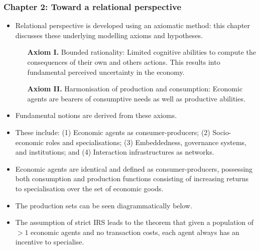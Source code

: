 \documentclass[10pt]{beamer}
\begin{document}
\begin{frame} \frametitle{Chapter 2: Toward a relational perspective}
\begin{itemize}
\item Relational perspective is developed using an axiomatic method: this chapter discusses these underlying modelling axioms and hypotheses.
\begin{itemize}
\medskip
\item[\textbf{Axiom I.}] Bounded rationality: Limited cognitive abilities to compute the consequences of their own and others actions. This
results into fundamental perceived uncertainty in the economy.
\medskip
\item[\textbf{Axiom II.}] Harmonisation of production and consumption: Economic agents are bearers of consumptive needs as well as productive abilities.
\end{itemize}
\medskip
\item Fundamental notions are derived from these axioms.
\medskip
\item These include: (1) Economic agents as consumer-producers; (2) Socio-economic roles and specialisations; (3) Embeddedness, governance systems, and institutions; and (4) Interaction infrastructures as networks.
\end{itemize}
\end{frame}


\begin{frame} %
\begin{itemize}
\item Economic agents are identical and defined as consumer-producers, possessing both consumption and production functions consisting of increasing returns to specialisation over the set of economic goods.
\medskip
\item The production sets can be seen diagrammatically below.
\medskip
\item The assumption of strict IRS leads to the theorem that given a population of $> 1$ economic agents and no transaction costs, each agent always has an incentive to specialise.
\end{itemize}
\end{frame}
\end{document}
